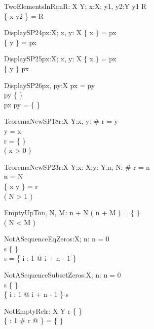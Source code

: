\begin{theorem}{TwoElementsInRan}{R: X \rel Y; x:X; \const y1, \const y2:Y}
y1 \in \ran R \\
\{ x \mapsto y2 \} = R
\end{theorem}

\begin{theorem}{DisplaySP24}{px:\power X; \const x, \const y: X}
\{ x \} = px \\
\{ y \} = px
\end{theorem}

\begin{theorem}{DisplaySP25}{px:\power X; \const x, \const y: X}
\{ x \} = px \\
\{ y \} \subset px
\end{theorem}

\begin{theorem}{DisplaySP26}{px, py:\power X}
px = py \\
py \neq \{ \} \\
px \cap py = \{ \}
\end{theorem}

\begin{theorem}{TeoremaNewSP18}{r:X \rel Y;\const x, y:\nat}
\# \dom r = y \\
y = x \\
r = \{ \} \\
\eval( x > 0 )
\end{theorem}

\begin{theorem}{TeoremaNewSP23}{r:X \rel Y;x: X;y: Y;n, \const N: \nat}
\# \dom r = n \\
n = N \\
\{ x \mapsto y \} = r \\
\eval( N > 1 )
\end{theorem}

\begin{theorem}{EmptyUpTo}{n, \const N, \const M:\nat}
n + N \upto ( n + M ) = \{ \} \\
\eval( N < M )
\end{theorem}

\begin{theorem}{NotASequenceEqZero}{s:\seq X; n:\nat}
n = 0 \\
s \neq \{ \} \\
\dom s = \dom \{ i : 1 \upto \anything @ i + n - 1 \mapsto \anything \}
\end{theorem}

\begin{theorem}{NotASequenceSubsetZero}{s:\seq X; n:\nat}
n = 0 \\
s \neq \{ \} \\
\dom \{ i : 1 \upto \anything @ i + n - 1 \mapsto \anything \} \subset \dom s
\end{theorem}

\begin{theorem}{NotEmptyRel}{r: X \rel Y}
r \neq \{ \} \\
\{ \anything : 1 \upto \# r @ \anything \} = \{ \} \\
\end{theorem}